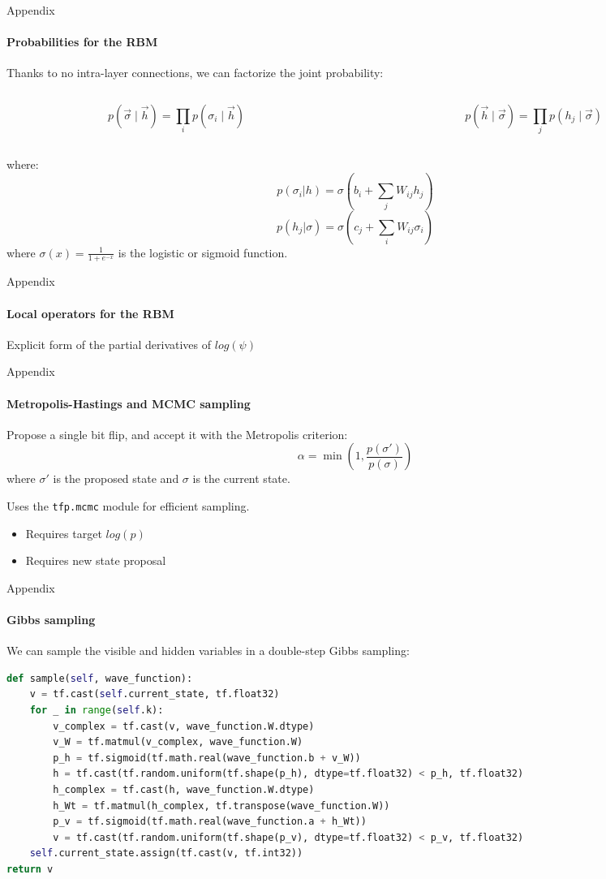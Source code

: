\documentclass{beamer}
\begin{document}
\begin{frame}{Appendix}
\framesubtitle{Probabilities for the RBM}

Thanks to no intra-layer connections, we can factorize the joint probability:

\begin{columns}[t]
	\begin{column}{0.48\textwidth}
		$$ p(\vec{\sigma} \mid \vec{h}) = \prod_{i} p(\sigma_i \mid \vec{h}) $$
	\end{column}
	\begin{column}{0.48\textwidth}
		$$ p(\vec{h} \mid \vec{\sigma}) = \prod_{j} p(h_j \mid \vec{\sigma}) $$
	\end{column}
\end{columns}
where:
$$ p(\sigma_i | h) = \sigma\left(b_i + \sum_{j} W_{ij} h_j\right) $$
$$ p(h_j | \sigma) = \sigma\left(c_j + \sum_{i} W_{ij} \sigma_i\right) $$
where $\sigma(x) = \frac{1}{1 + e^{-x}}$ is the logistic or sigmoid function.

\end{frame}

\begin{frame}{Appendix}
\framesubtitle{Local operators for the RBM}
Explicit form of the partial derivatives of $log\left(\psi\right)$


\end{frame}

\begin{frame}[fragile]{Appendix}
\framesubtitle{Metropolis-Hastings and MCMC sampling}
Propose a single bit flip, and accept it with the Metropolis criterion:
$$\alpha = \min\left(1, \frac{p(\sigma')}{p(\sigma)}\right)$$
where $\sigma'$ is the proposed state and $\sigma$ is the current state.
\baselineskip

Uses the \lstinline[style=kaolstplain]|tfp.mcmc| module for efficient sampling.
\begin{itemize}
	\item Requires target $log(p)$
	\item Requires new state proposal
\end{itemize}

\end{frame}

\begin{frame}[fragile]{Appendix}
\framesubtitle{Gibbs sampling}
We can sample the visible and hidden variables in a double-step Gibbs sampling:
\begin{lstlisting}[language=Python, style=kaolstplain]
def sample(self, wave_function):
	v = tf.cast(self.current_state, tf.float32)
	for _ in range(self.k):
		v_complex = tf.cast(v, wave_function.W.dtype)
		v_W = tf.matmul(v_complex, wave_function.W)
		p_h = tf.sigmoid(tf.math.real(wave_function.b + v_W))
		h = tf.cast(tf.random.uniform(tf.shape(p_h), dtype=tf.float32) < p_h, tf.float32)
		h_complex = tf.cast(h, wave_function.W.dtype)
		h_Wt = tf.matmul(h_complex, tf.transpose(wave_function.W))
		p_v = tf.sigmoid(tf.math.real(wave_function.a + h_Wt))
		v = tf.cast(tf.random.uniform(tf.shape(p_v), dtype=tf.float32) < p_v, tf.float32)
	self.current_state.assign(tf.cast(v, tf.int32))
return v
\end{lstlisting}
\end{frame}
\end{document}
